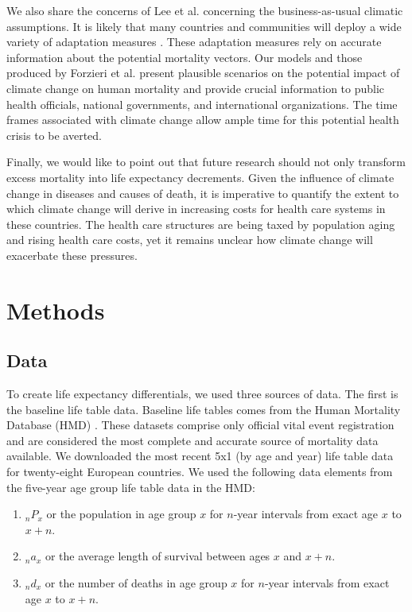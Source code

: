 \documentclass[12pt,]{article}
\begin{document}
We also share the concerns of Lee et al. \citep{lee2017comprehensive}
concerning the business-as-usual climatic assumptions. It is likely that
many countries and communities will deploy a wide variety of adaptation
measures \citep{haines2006climate, kovats2003methods, ebi2006approach}.
These adaptation measures rely on accurate information about the
potential mortality vectors. Our models and those produced by Forzieri
et al. \citep{forzieri2017increasing} present plausible scenarios on the
potential impact of climate change on human mortality and provide
crucial information to public health officials, national governments,
and international organizations. The time frames associated with climate
change allow ample time for this potential health crisis to be averted.

Finally, we would like to point out that future research should not only
transform excess mortality into life expectancy decrements. Given the
influence of climate change in diseases and causes of death, it is
imperative to quantify the extent to which climate change will derive in
increasing costs for health care systems in these countries. The health
care structures are being taxed by population aging
\citep{rechel2009can} and rising health care costs, yet it remains
unclear how climate change will exacerbate these pressures.

\newpage

\section{Methods}\label{methods}

\subsection{Data}\label{data}

To create life expectancy differentials, we used three sources of data.
The first is the baseline life table data. Baseline life tables comes
from the Human Mortality Database (HMD) \citep{HMD}. These datasets
comprise only official vital event registration and are considered the
most complete and accurate source of mortality data available. We
downloaded the most recent 5x1 (by age and year) life table data for
twenty-eight European countries. We used the following data elements
from the five-year age group life table data in the HMD:

\begin{enumerate}
\item $_nP_x$ or the population in age group $x$ for $n$-year intervals from exact age $x$ to $x+n$.
\item $_na_x$ or the average length of survival between ages $x$ and $x+n$.
\item $_nd_x$ or the number of deaths in age group $x$ for $n$-year intervals from exact age $x$ to $x+n$.
\end{enumerate}
\end{document}
